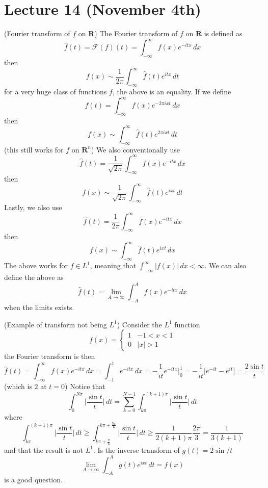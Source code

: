 \section{Lecture 14 (November 4th)}
\begin{defi}
(Fourier transform of $f$ on ${\bm R}$) The Fourier transform of $f$ on ${\bm R}$ is defined as
\[\widehat{f}(t)=\mathcal{F}(f)(t)=\int ^{\infty }_{-\infty }f(x)e^{-itx}\,dx \]
then 
\[f(x)\sim \dfrac{1}{2\pi }\int _{-\infty }^{\infty }\widehat{f}(t)e^{itx}\,dt\]
for a very huge class of functions $f$, the above is an equality. If we define 
\[\hat{f}(t)=\int ^{\infty }_{-\infty }f(x)e^{-2\pi ixt}\,dx\]
then 
\[f(x)\sim \int ^{\infty }_{-\infty }\hat{f}(t)e^{2\pi ixt}\,dt\]
(this still works for $f$ on ${\bm R}^{n}$) We also conventionally use
\[\widehat{f}(t)=\dfrac{1}{\sqrt{2\pi }}\int ^{\infty }_{-\infty }f(x)e^{-itx}\,dx\]
then
\[f(x)\sim \dfrac{1}{\sqrt{2\pi }}\int ^{\infty }_{-\infty }\widehat{f}(t)e^{ixt}\,dt\]
Lastly, we also use
\[\widehat{f}(t)=\dfrac{1}{2\pi }\int ^{\infty }_{-\infty }f(x)e^{-itx}\,dx\]
then
\[f(x)\sim \int ^{\infty }_{-\infty }\hat{f}(t)e^{ixt}\,dx\]
The above works for $f\in L^{1}$, meaning that $\int ^{\infty }_{-\infty }|f(x)|\,dx<\infty $. We can also define the above as
\[\widehat{f}(t)=\lim _{A\rightarrow \infty }\int ^{A}_{-A}f(x)e^{-itx}\,dx\]
when the limits exists.
\end{defi}
\vspace{2ex}
\begin{ex}
(Example of transform not being $L^{1}$) Consider the $L^{1}$ function
\[f(x)=\begin{cases}
1&-1<x<1\\
0&|x|>1
\end{cases}\]
the Fourier transform is then
\[\hat{f}(t)=\int ^{\infty }_{-\infty }f(x)e^{-itx}\,dx=\int ^{1}_{-1}e^{-itx}\,dx=-\dfrac{1}{it}e^{-itx}|^{1}_{0}=-\dfrac{1}{it}\Big[e^{-it}-e^{it}\Big]=\dfrac{2\sin t}{t}\]
(which is $2$ at $t=0$) Notice that
\[\int ^{N\pi }_{0}\Big|\dfrac{\sin t}{t}\Big|\,dt=\sum ^{N-1}_{k=0}\int ^{(k+1)\pi }_{k\pi }\Big|\dfrac{\sin t}{t}\Big|\,dt\]
where
\[\int ^{(k+1)\pi }_{k\pi }\Big|\dfrac{\sin t}{t}\Big|\,dt\geq \int ^{k\pi +\frac{5\pi }{6}}_{k\pi +\frac{\pi }{6}}\Big|\frac{\sin t}{t}\Big|\,dt\geq \dfrac{1}{2(k+1)\pi }\dfrac{2\pi }{3}=\dfrac{1}{3(k+1)}\]
and that the result is not $L^{1}$. Is the inverse transform of $g(t)=2\sin /t$ 
\[\lim_{A\rightarrow \infty }\int ^{A}_{-A}g(t)e^{ixt}\,dt=f(x)\]
is a good question.
\end{ex}
\vspace{2ex}
